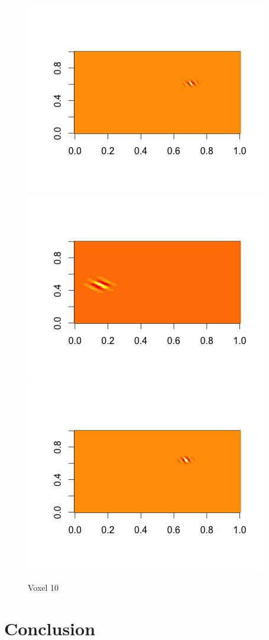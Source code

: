 \documentclass[english]{amsart}
\begin{document}
\vspace{-10mm}
\begin{figure}[H]
  \includegraphics[width=\linewidth, height = 150pts]{voxel10_wave3.png}
\endminipage\hfill
\vspace{-5mm}
  \includegraphics[width=\linewidth, height = 150pts]{voxel10_wave2.png}
\endminipage\hfill
{}
  \includegraphics[width=\linewidth, height = 150pts]{voxel10_wave1.png}
\endminipage
  \caption{Voxel 10}
\end{figure}



\section{Conclusion}
\end{document}
